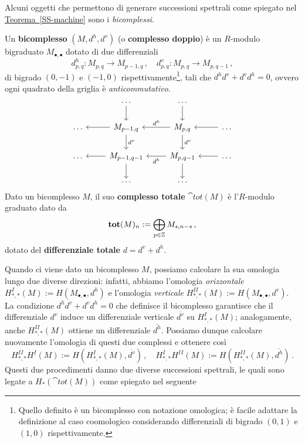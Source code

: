 \begin{ex!}
	Alcuni oggetti che permettono di generare successioni spettrali come
	spiegato nel \hyperref[SS-machine]{Teorema~\ref{SS-machine}}
	sono i \emph{bicomplessi}.
	\begin{df}
		Un \textbf{bicomplesso} $(M,d^{h},d^{v})$ (o \textbf{complesso doppio})
		è un $R$-modulo bigraduato $M_{\bullet,\bullet}$
		dotato di due differenziali
		\begin{equation*}
			d^{h}_{p,q}: M_{p,q} \longrightarrow M_{p-1,q}\,, \quad
			d^{v}_{p,q}: M_{p,q} \longrightarrow M_{p,q-1}\,,
		\end{equation*}
		di bigrado $(0,-1)$ e $(-1,0)$ rispettivamente\footnote{Quello definito è un bicomplesso con notazione omologica; è facile adattare la definizione al caso coomologico considerando differenziali di bigrado $(0,1)$ e $(1,0)$ rispettivamente.},
		tali che $d^{h}d^{v} + d^{v}d^{h}=0$, ovvero ogni quadrato della griglia
		è \emph{anticommutativo}.
		\begin{equation*}
			\begin{tikzcd}
      & \dots \arrow[d]                        & \dots \arrow[d]                              &                 \\
\dots & {M_{p-1,q}} \arrow[d, "d^v"] \arrow[l] & {M_{p,q}} \arrow[d, "d^v"] \arrow[l, "d^h"'] & \dots \arrow[l] \\
\dots & {M_{p-1,q-1}} \arrow[d] \arrow[l]      & {M_{p,q-1}} \arrow[l, "d^h"] \arrow[d]       & \dots \arrow[l] \\
      & \dots                                  & \dots                                        &                
\end{tikzcd}
		\end{equation*}
		Dato un bicomplesso $M$, il suo \textbf{complesso totale} $\cat{tot}(M)$
	è l'$R$-modulo graduato dato da
	\begin{equation*}
		{\normalfont\textbf{tot}}(M)_{n} := \bigoplus_{p \in {\mathbb Z}} M_{s,n-s}\,,
	\end{equation*}
	dotato del \textbf{differenziale totale} $d = d^{v} + d^{h}$.
	\end{df}
	
	Quando ci viene dato un bicomplesso $M$, possiamo calcolare la sua omologia
	lungo due diverse direzioni: infatti, abbiamo l'omologia \emph{orizzontale}
	$H^{I}_{*,*}(M) := H(M_{\bullet, \bullet}, d^{h})$
	e l'omologia \emph{verticale} $H^{II}_{*,*}(M) := H(M_{\bullet, \bullet}, d^{v})$.
	La condizione $d^{h}d^{v} + d^{v}d^{h}=0$ che definisce il bicomplesso
	garantisce che il differenziale $d^{v}$ induce un differenziale verticale
	$\overline{d^{v}}$ su $H^{I}_{*,*}(M)$; analogamente, anche
	$H^{II}_{*,*}(M)$ ottiene un differenziale $\overline{d^{h}}$.
	Possiamo dunque calcolare nuovamente l'omologia di questi due complessi
	e ottenere così
	\begin{equation*}
		H^{II}_{*,*}H^{I}(M) := H\left(H^{I}_{*,*}(M), \overline{d^{v}}\right)\,, \quad
		H^{I}_{*,*}H^{II}(M) := H\left(H^{II}_{*,*}(M), \overline{d^{h}}\right)\,.
	\end{equation*}
	Questi due procedimenti danno due diverse successioni spettrali,
	le quali sono legate a $H_{*}(\cat{tot}(M))$ come spiegato nel seguente
	

\end{ex!}
